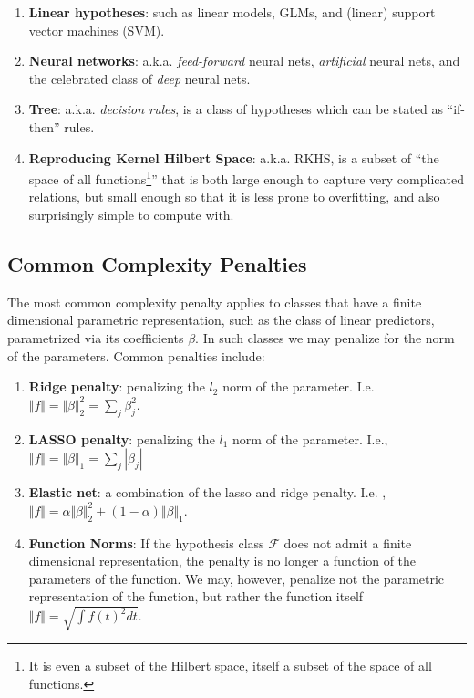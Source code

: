 \documentclass[]{book}
\providecommand{\tightlist}{%
  \setlength{\itemsep}{0pt}\setlength{\parskip}{0pt}}
\theoremstyle{definition}
\theoremstyle{definition}
\theoremstyle{definition}
\theoremstyle{remark}
\begin{document}
\begin{enumerate}
\def\labelenumi{\arabic{enumi}.}
\item
  \textbf{Linear hypotheses}: such as linear models, GLMs, and (linear)
  support vector machines (SVM).
\item
  \textbf{Neural networks}: a.k.a. \emph{feed-forward} neural nets,
  \emph{artificial} neural nets, and the celebrated class of \emph{deep}
  neural nets.
\item
  \textbf{Tree}: a.k.a. \emph{decision rules}, is a class of hypotheses
  which can be stated as ``if-then'' rules.
\item
  \textbf{Reproducing Kernel Hilbert Space}: a.k.a. RKHS, is a subset of
  ``the space of all functions\footnote{It is even a subset of the
    Hilbert space, itself a subset of the space of all functions.}''
  that is both large enough to capture very complicated relations, but
  small enough so that it is less prone to overfitting, and also
  surprisingly simple to compute with.
\end{enumerate}

\subsection{Common Complexity
Penalties}\label{common-complexity-penalties}

The most common complexity penalty applies to classes that have a finite
dimensional parametric representation, such as the class of linear
predictors, parametrized via its coefficients \(\beta\). In such classes
we may penalize for the norm of the parameters. Common penalties
include:

\begin{enumerate}
\def\labelenumi{\arabic{enumi}.}
\tightlist
\item
  \textbf{Ridge penalty}: penalizing the \(l_2\) norm of the parameter.
  I.e. \(\Vert f \Vert=\Vert \beta \Vert_2^2=\sum_j \beta_j^2\).
\item
  \textbf{LASSO penalty}: penalizing the \(l_1\) norm of the parameter.
  I.e., \(\Vert f \Vert=\Vert \beta \Vert_1=\sum_j |\beta_j|\)
\item
  \textbf{Elastic net}: a combination of the lasso and ridge penalty.
  I.e.
  ,\(\Vert f \Vert= \alpha \Vert \beta \Vert_2^2 + (1-\alpha) \Vert \beta \Vert_1\).
\item
  \textbf{Function Norms}: If the hypothesis class \(\mathcal{F}\) does
  not admit a finite dimensional representation, the penalty is no
  longer a function of the parameters of the function. We may, however,
  penalize not the parametric representation of the function, but rather
  the function itself \(\Vert f \Vert=\sqrt{\int f(t)^2 dt}\).
\end{enumerate}
\end{document}
